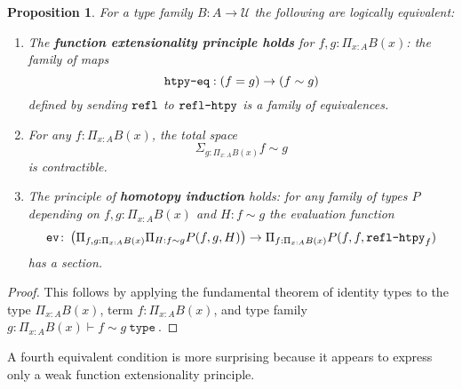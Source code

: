 \documentclass{amsart}
\theoremstyle{theorem}
\newtheorem*{prop}{Proposition}
\theoremstyle{definition}
\theoremstyle{remark}
\newcommand{\0}{\mathbbe{0}}
\newcommand{\1}{\mathbbe{1}}
\newcommand{\2}{\mathbbe{2}}
\newcommand{\3}{\mathbbe{3}}
\newcommand{\4}{\mathbbe{4}}
\newcommand{\univ}{{~\texttt{type}~}}
\newcommand{\term}[1]{{\textup{\texttt{#1}}}}
\newcommand{\refl}{\term{refl}}
\newcommand{\UU}{{\mathcal{U}}}
\newcommand{\ev}{\term{ev}}
\begin{document}
\begin{prop} For a type family $B : A \to \UU$ the following are logically equivalent:
\begin{enumerate}
\item The \textbf{function extensionality principle holds} for $f,g : \Pi_{x:A}B(x)$: the family of maps
\[ \term{htpy-eq} : (f=g) \to (f \sim g)\]
defined by sending $\refl$ to $\term{refl-htpy}$ is a family of equivalences.
\item For any $f : \Pi_{x:A}B(x)$, the total space
\[ \Sigma_{g : \Pi_{x:A}B(x)} f \sim g\]
is contractible.
\item The principle of \textbf{homotopy induction} holds: for any family of types $P$ depending on $f,g : \Pi_{x:A}B(x)$ and $H : f \sim g$ the evaluation function
\[ \ev\colon \left( \Pi_{f,g : \Pi_{x:A}B(x)} \Pi_{H : f \sim g} P(f,g,H) \right) \to \Pi_{f : \Pi_{x:A}B(x)} P(f,f, \term{refl-htpy}_f)\]
has a section.
\end{enumerate}
\end{prop}
\begin{proof}
This follows by applying the fundamental theorem of identity types to the type $\Pi_{x:A}B(x)$, term $f : \Pi_{x:A}B(x)$, and type family $g : \Pi_{x:A}B(x) \vdash f \sim g \univ$.
\end{proof}

A fourth equivalent condition is more surprising because it appears to express only a weak function extensionality principle.
\end{document}
